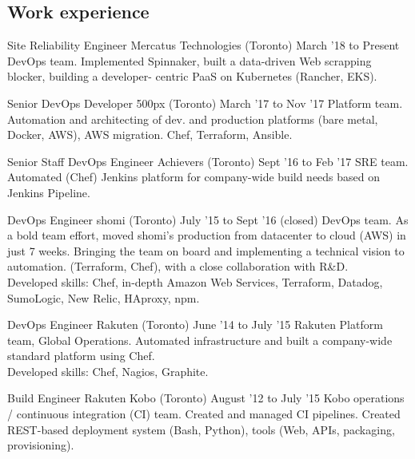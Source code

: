 \documentclass[]{cvpn}
\begin{document}
\cvheader{}

\begin{multicols}{2}
\section{Work experience}
\begin{eventlist}

\item{Site Reliability Engineer}
     {Mercatus Technologies (Toronto)}
     {March '18 to Present}
{
DevOps team.
Implemented Spinnaker,
built a data-driven Web scrapping blocker,
building a developer- centric PaaS on Kubernetes
(Rancher, EKS).
}

\item{Senior DevOps Developer}
     {500px (Toronto)}
     {March '17 to Nov '17}
{
Platform team.
Automation and architecting of dev.
and production platforms (bare metal, Docker, AWS),
AWS migration. Chef, Terraform, Ansible.
}

\item{Senior Staff DevOps Engineer}
     {Achievers (Toronto)}
     {Sept '16 to Feb '17}
{
SRE team.
Automated (Chef) Jenkins platform for company-wide build
needs based on Jenkins Pipeline.
}

\item{DevOps Engineer}
     {shomi (Toronto)}
     {July '15 to Sept '16 (closed)}
{
DevOps team. As a bold team effort, moved shomi's
production from datacenter to cloud (AWS) in just 7 weeks.
Bringing the team on board and implementing a technical
vision to automation. (Terraform, Chef),
with a close collaboration with R\&D.\\

Developed skills: Chef, in-depth Amazon Web Services,
Terraform, Datadog, SumoLogic, New Relic, HAproxy, npm.
}

\item{DevOps Engineer}
     {Rakuten (Toronto)}
     {June '14 to July '15}
{
Rakuten Platform team, Global Operations.
Automated infrastructure and built a company-wide
standard platform using Chef.\\

Developed skills: Chef, Nagios, Graphite.
}

\item{Build Engineer}
     {Rakuten Kobo (Toronto)}
     {August '12 to July '15}
{
Kobo operations / continuous integration (CI) team.
Created and managed CI pipelines.
Created REST-based deployment system (Bash, Python),
tools (Web, APIs, packaging, provisioning).\\

}
\end{eventlist}
\end{multicols}
\end{document}
